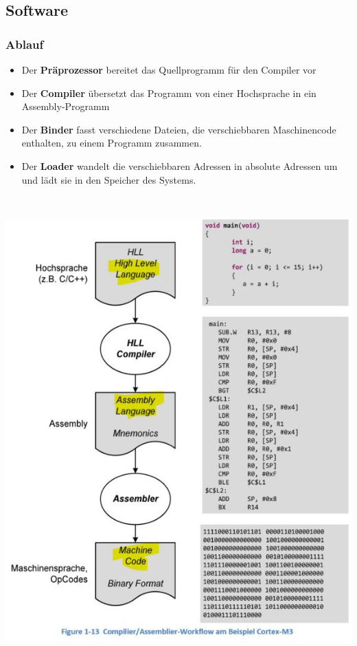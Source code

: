 \subsection{Software}
\begin{minipage}[b]{11cm}
	\subsubsection{Ablauf}
	\begin{itemize}
    	\item Der \textbf{Präprozessor} bereitet das Quellprogramm für den Compiler vor
    	\item Der \textbf{Compiler} übersetzt das Programm von einer Hochsprache in ein Assembly-Programm
    	\item Der \textbf{Binder} fasst verschiedene Dateien, die verschiebbaren Maschinencode enthalten, zu einem Programm zusammen.
    	\item Der \textbf{Loader} wandelt die verschiebbaren Adressen in absolute Adressen um und lädt sie in den Speicher des Systems.
	\end{itemize}
\end{minipage}
%
\begin{minipage}{0.5cm}
	\-\
\end{minipage}
%
\begin{minipage}{7cm}
	\includegraphics[width=\linewidth]{images/CompilerWorkflow}
\end{minipage}






















    